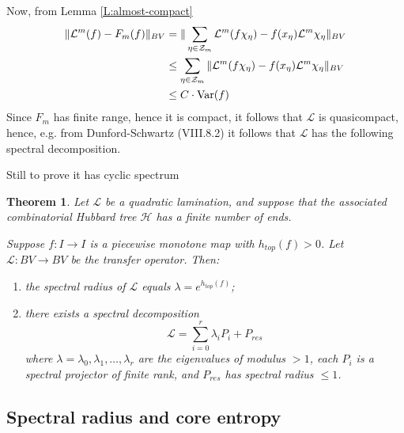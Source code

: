 \documentclass[11pt]{amsart}
\newtheorem{theorem}{Theorem}[section]
\newcommand{\var}{\textup{Var}}
\begin{document}
Now, from Lemma \ref{L:almost-compact}
\begin{align*}
\Vert \mathcal{L}^m(f) - F_m(f) \Vert_{BV} & = \Vert  \sum_{\eta \in \mathcal{Z}_m} \mathcal{L}^m(f \chi_\eta) -  f(x_\eta) \mathcal{L}^m \chi_\eta \Vert_{BV}\\
& \leq  \sum_{\eta \in \mathcal{Z}_m}  \Vert\mathcal{L}^m(f \chi_\eta) -  f(x_\eta) \mathcal{L}^m \chi_\eta  \Vert_{BV} \\
& \leq C \cdot \var(f)
\end{align*}
Since $F_m$ has finite range, hence it is compact, it follows that $\mathcal{L}$ is quasicompact, 
hence, e.g. from Dunford-Schwartz (VIII.8.2) it follows that $\mathcal{L}$ has the following 
spectral decomposition. 

{\color{blue} Still to prove it has cyclic spectrum}

\begin{theorem}
Let $\mathcal{L}$ be a quadratic lamination, and suppose that the associated combinatorial Hubbard tree $\mathcal{H}$ 
has a finite number of ends. 

Suppose $f : I \to I$ is a piecewise monotone map with $h_{top}(f) > 0$.
Let $\mathcal{L} : BV \to BV$ be the transfer operator. Then: 
\begin{enumerate}
\item the spectral radius of $\mathcal{L}$ equals $\lambda = e^{h_{top}(f)}$; 
\item there exists a spectral decomposition 
$$\mathcal{L} = \sum_{i = 0}^r \lambda_i P_i + P_{res}$$
where $\lambda = \lambda_0, \lambda_1, \dots, \lambda_r$ are the eigenvalues of modulus $> 1$, each $P_i$ is a spectral projector of finite rank, and $P_{res}$ has spectral radius $\leq 1$. 
\end{enumerate}
\end{theorem}



\subsection{Spectral radius and core entropy}
\end{document}
